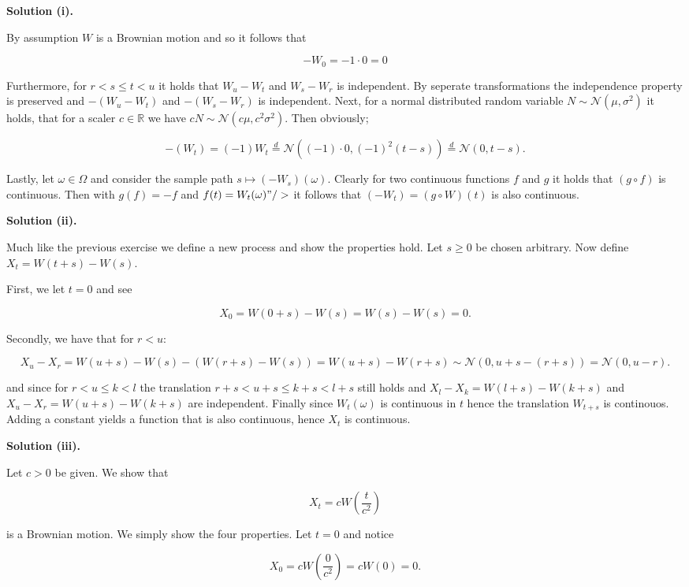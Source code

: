 \documentclass[a4paper,12pt,openany]{book}
\begin{document}
\textbf{Solution (i).}

By assumption \(W\) is a Brownian motion and so it follows that

\[
-W_0=-1\cdot0=0
\]

Furthermore, for \(r<s\le t< u\) it holds that \(W_u-W_t\) and \(W_s-W_r\) is independent. By seperate transformations the independence property is preserved and \(-(W_u-W_t)\) and \(-(W_s-W_r)\) is independent. Next, for a normal distributed random variable \(N\sim\mathcal{N}(\mu,\sigma^2)\) it holds, that for a scaler \(c\in\mathbb{R}\) we have \(c N\sim\mathcal{N}(c\mu,c^2\sigma ^2)\). Then obviously;

\[
-(W_t)=(-1)W_t\stackrel{d}{=}\mathcal{N}((-1)\cdot0,(-1)^2(t-s))\stackrel{d}{=}\mathcal{N}( 0,t-s).
\]

Lastly, let \(\omega \in \Omega\) and consider the sample path \(s\mapsto (-W_s)(\omega)\). Clearly for two continuous functions \(f\) and \(g\) it holds that \((g\circ f)\) is continuous. Then with \(g(f)=-f\) and \(f(t)=W_t(\omega)"/>\) it follows that \((-W_t)=(g\circ W)(t)\) is also continuous.

\textbf{Solution (ii).}

Much like the previous exercise we define a new process and show the properties hold. Let \(s\ge 0\) be chosen arbitrary. Now define \(X_t=W(t+s)-W(s)\).

First, we let \(t=0\) and see

\[
X_0=W(0+s)-W(s)=W(s)-W(s)=0.
\]

Secondly, we have that for \(r<u\):

\[
X_u-X_r=W(u+s)-W(s)-(W(r+s)-W(s))=W(u+s)-W(r+s)\sim \mathcal{N}(0,u+s-(r+s))=\mathcal{N}(0,u-r).
\]

and since for \(r<u\le k<l\) the translation \(r+s<u+s\le k+s<l+s\) still holds and \(X_l-X_k=W(l+s)-W(k+s)\) and \(X_u-X_r=W(u+s)-W(k+s)\) are independent. Finally since \(W_t(\omega)\) is continuous in \(t\) hence the translation \(W_{t+s}\) is continouos. Adding a constant yields a function that is also continuous, hence \(X_t\) is continuous.

\textbf{Solution (iii).}

Let \(c>0\) be given. We show that

\[
X_t=cW\left(\frac{t}{c^2}\right)
\]

is a Brownian motion. We simply show the four properties. Let \(t=0\) and notice

\[
X_0=cW\left(\frac{0}{c^2}\right)=cW(0)=0.
\]
\end{document}
